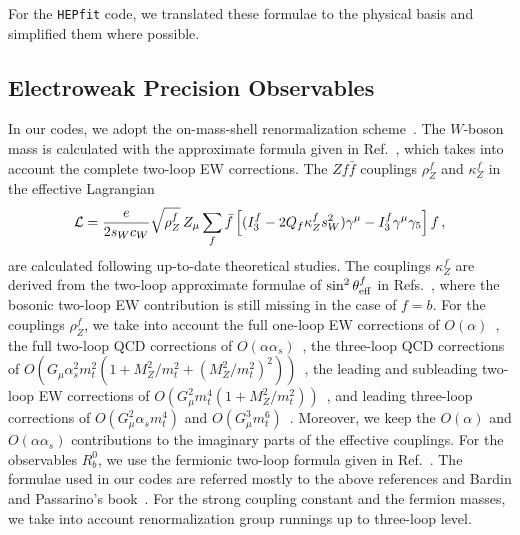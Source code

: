 \documentclass[preprint,3p,12pt]{elsarticle}
\newcommand{\HEPfit}{\texttt{HEPfit}\xspace}
\newcommand{\satoshisnotes}[1]{{\color{blue}  #1}}
\begin{document}
{For the \HEPfit code, we translated these formulae to the physical basis and simplified them where possible.

\subsection{Electroweak Precision Observables}
\label{sec:EWPO}

\satoshisnotes{%
In our codes, we adopt the 
on-mass-shell renormalization
scheme~\cite{Sirlin:1980nh,Marciano:1980pb,Bardin:1980fe,Bardin:1981sv}.
The $W$-boson mass is calculated with the approximate formula given in
Ref.~\cite{Awramik:2003rn}, which takes 
into account the complete two-loop EW corrections. 
The $Zf\bar{f}$ couplings $\rho_Z^f$ and $\kappa_Z^f$ in the effective
Lagrangian 
\begin{eqnarray}
\label{eq:gvga}
{\cal L}
=
\frac{e}{2 s_W c_W}\sqrt{\rho_Z^f}\,
Z_\mu \sum_f \bar{f}
\left[( I_3^f - 2Q_f\kappa_Z^f s_W^2)\gamma^\mu 
  - I_3^f\gamma^\mu\gamma_5\right]f\,,
\end{eqnarray}
are calculated following up-to-date theoretical studies. The couplings 
$\kappa_Z^f$ are derived from the two-loop approximate formulae of 
$\sin^2\theta_{\rm eff}^{f}$ in
Refs.~\cite{Awramik:2004ge,Awramik:2006uz,Awramik:2008gi}, where the
bosonic two-loop EW contribution is still missing in the case of $f=b$. 
For the couplings $\rho_Z^f$, we take into account 
the full one-loop EW corrections of
$O(\alpha)$~\cite{Sirlin:1980nh,Marciano:1980pb}, the full two-loop
QCD corrections of $O(\alpha\alpha_s)$~\cite{Djouadi:1987gn,
  Djouadi:1987di,Kniehl:1989yc,Halzen:1990je,Kniehl:1991gu,Kniehl:1992dx,Djouadi:1993ss}, 
the three-loop QCD corrections of
$O\left(G_\mu\alpha_s^2m_t^2(1+M_Z^2/m_t^2
  +(M_Z^2/m_t^2)^2)\right)$~\cite{Avdeev:1994db,Chetyrkin:1995ix,Chetyrkin:1995js},
the leading and subleading two-loop EW corrections of
$O(G_\mu^2m_t^4(1+M_Z^2/m_t^2))$~\cite{Barbieri:1992nz,Barbieri:1992dq,
  Fleischer:1993ub,Fleischer:1994cb,Degrassi:1996mg,Degrassi:1996ps,Degrassi:1999jd}, 
and leading
three-loop corrections of $O(G_\mu^2\alpha_s m_t^4)$ and
$O(G_\mu^3m_t^6)$~\cite{vanderBij:2000cg,Faisst:2003px}.
Moreover, we keep the $O(\alpha)$ and $O(\alpha\alpha_s)$
contributions to the imaginary parts of the effective couplings. 
For the observables $R_b^0$, 
we use the fermionic two-loop formula given in Ref.~\cite{Freitas:2012sy}. 
The formulae used in our codes are referred mostly to 
the above references and 
Bardin and Passarino's book~\cite{Bardin:1999ak}. 
For the strong coupling constant and the fermion masses, we take into
account renormalization group runnings up to three-loop level. 
}%


}
\end{document}
